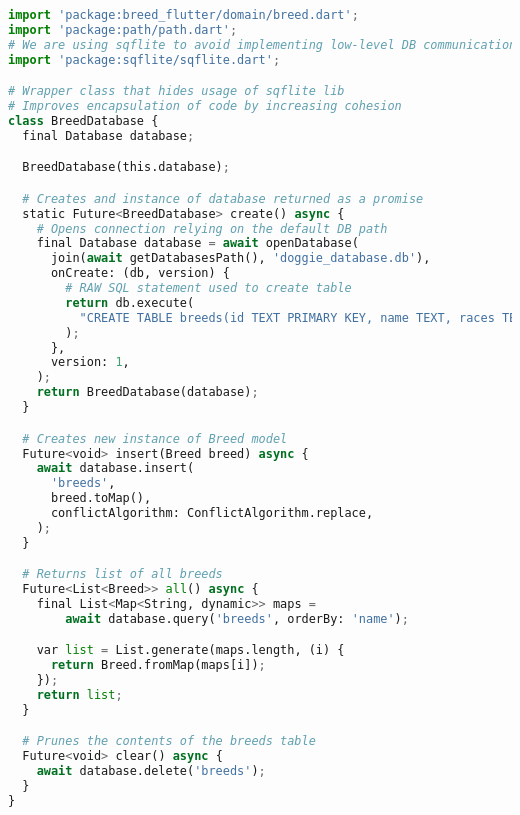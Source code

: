 \begin{lstlisting}[style=light, language=Python,label={lst:flutter_sqflite},caption=Flutter SQFLITE]
import 'package:breed_flutter/domain/breed.dart';
import 'package:path/path.dart';
# We are using sqflite to avoid implementing low-level DB communication
import 'package:sqflite/sqflite.dart';

# Wrapper class that hides usage of sqflite lib
# Improves encapsulation of code by increasing cohesion
class BreedDatabase {
  final Database database;

  BreedDatabase(this.database);

  # Creates and instance of database returned as a promise
  static Future<BreedDatabase> create() async {
    # Opens connection relying on the default DB path
    final Database database = await openDatabase(
      join(await getDatabasesPath(), 'doggie_database.db'),
      onCreate: (db, version) {
        # RAW SQL statement used to create table
        return db.execute(
          "CREATE TABLE breeds(id TEXT PRIMARY KEY, name TEXT, races TEXT, isFavorite INTEGER)",
        );
      },
      version: 1,
    );
    return BreedDatabase(database);
  }

  # Creates new instance of Breed model
  Future<void> insert(Breed breed) async {
    await database.insert(
      'breeds',
      breed.toMap(),
      conflictAlgorithm: ConflictAlgorithm.replace,
    );
  }

  # Returns list of all breeds
  Future<List<Breed>> all() async {
    final List<Map<String, dynamic>> maps =
        await database.query('breeds', orderBy: 'name');

    var list = List.generate(maps.length, (i) {
      return Breed.fromMap(maps[i]);
    });
    return list;
  }

  # Prunes the contents of the breeds table
  Future<void> clear() async {
    await database.delete('breeds');
  }
}
\end{lstlisting}

